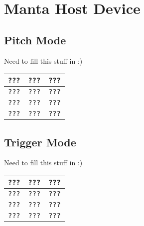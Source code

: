 \section{Manta Host Device}
\subsection{Pitch Mode}
  Need to fill this stuff in :)
  \begin{center}
  \begin{tabular}{ | m{1.5cm} | m{1.5cm}| m{1.5cm} | }
    \hline
    \texttt{???} & \texttt{???} & \texttt{???} \\
    \hline
    \texttt{???} & \texttt{???} & \texttt{???} \\
    \hline
    \texttt{???} & \texttt{???} & \texttt{???} \\
    \hline
    \texttt{???} & \texttt{???} & \texttt{???} \\
    \hline
  \end{tabular}
  \end{center}

\subsection{Trigger Mode}
  Need to fill this stuff in :)
  \begin{center}
  \begin{tabular}{ | m{1.5cm} | m{1.5cm}| m{1.5cm} | }
    \hline
    \texttt{???} & \texttt{???} & \texttt{???} \\
    \hline
    \texttt{???} & \texttt{???} & \texttt{???} \\
    \hline
    \texttt{???} & \texttt{???} & \texttt{???} \\
    \hline
    \texttt{???} & \texttt{???} & \texttt{???} \\
    \hline
  \end{tabular}
  \end{center}


